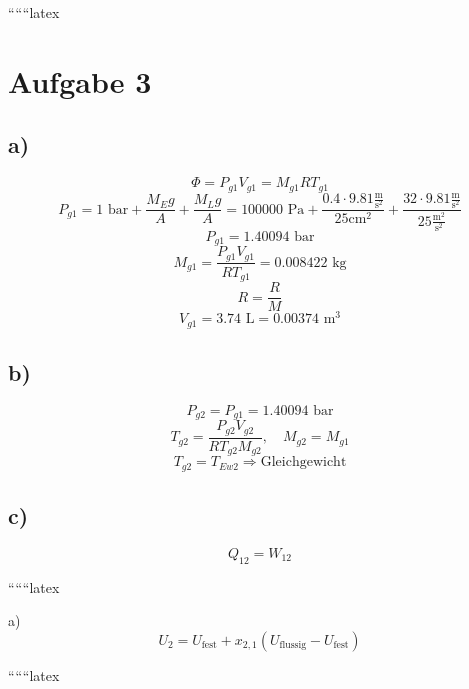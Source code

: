 
``````latex


\section*{Aufgabe 3}

\subsection*{a)}
\[
\Phi = P_{g1} V_{g1} = M_{g1} R T_{g1}
\]
\[
P_{g1} = 1 \text{ bar} + \frac{M_{E} g}{A} + \frac{M_{L} g}{A} = 100000 \text{ Pa} + \frac{0.4 \cdot 9.81 \frac{\text{m}}{\text{s}^2}}{25 \text{cm}^2} + \frac{32 \cdot 9.81 \frac{\text{m}}{\text{s}^2}}{25 \frac{\text{m}^2}{\text{s}^2}}
\]
\[
P_{g1} = 1.40094 \text{ bar}
\]
\[
M_{g1} = \frac{P_{g1} V_{g1}}{R T_{g1}} = 0.008422 \text{ kg}
\]
\[
R = \frac{R}{M}
\]
\[
V_{g1} = 3.74 \text{ L} = 0.00374 \text{ m}^3
\]

\subsection*{b)}
\[
P_{g2} = P_{g1} = 1.40094 \text{ bar}
\]
\[
T_{g2} = \frac{P_{g2} V_{g2}}{R T_{g2} M_{g2}}, \quad M_{g2} = M_{g1}
\]
\[
T_{g2} = T_{Ew2} \Rightarrow \text{Gleichgewicht}
\]

\subsection*{c)}
\[
Q_{12} = W_{12}
\]

``````latex


a) \[ U_2 = U_{\text{fest}} + x_{2,1} \left( U_{\text{flussig}} - U_{\text{fest}} \right) \]

``````latex


